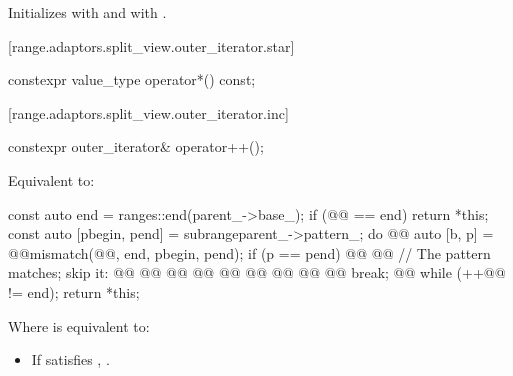 {\begin{itemdescr}
\pnum
\effects Initializes  with  and  with .
\end{itemdescr}

[range.adaptors.split_view.outer_iterator.star]{}

%
\begin{itemdecl}
constexpr value_type operator*() const;
\end{itemdecl}

\begin{itemdescr}
\pnum
\oldtxt{\returns}  
\end{itemdescr}

[range.adaptors.split_view.outer_iterator.inc]{}

%
\begin{itemdecl}
constexpr outer_iterator& operator++();
\end{itemdecl}

\begin{itemdescr}
\pnum
\effects Equivalent to:
\begin{codeblock}
const auto end = ranges::end(parent_->base_);
if (@@ == end) return *this;
const auto [pbegin, pend] = subrange{parent_->pattern_};
do {
  @@ auto [b, p] = @@mismatch(@@, end, pbegin, pend);
  if (p == pend) @@ @\newtxt{\{}@
    // The pattern matches; skip it:
    @@
    @@
      @@
      @@
        @@
        @@
      @\newtxt{\}}@
    @\newtxt{\}}@
    @@
    break;
  @\newtxt{\}}@
} while (++@@ != end);
return *this;
\end{codeblock}
\end{itemdescr}

{\color{oldclr}
Where  is equivalent to:
\begin{itemize}
\item If  satisfies , .


\end{itemize}}}

